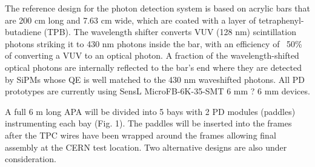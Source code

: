 The reference design for the photon detection system is based on acrylic bars that are 200 cm long and 7.63 cm wide, which are coated with a layer of tetraphenyl-butadiene (TPB). The wavelength shifter converts VUV (128 nm) scintillation photons striking it to 430 nm photons inside the bar, with an efficiency of ~50\% of converting a VUV to an optical photon.  A fraction of the wavelength-shifted optical photons are internally reflected to the bar's end where they are detected by SiPMs whose QE is well matched to the 430 nm waveshifted photons. All PD prototypes are currently using SensL MicroFB-6K-35-SMT 6 mm ? 6 mm devices. 

A full 6 m long APA will be divided into 5 bays with 2 PD modules (paddles) instrumenting each bay (Fig.  1). The paddles will be inserted into the frames after the TPC wires have been wrapped around the frames allowing  final assembly at the CERN test location. Two alternative designs are also under consideration. 

